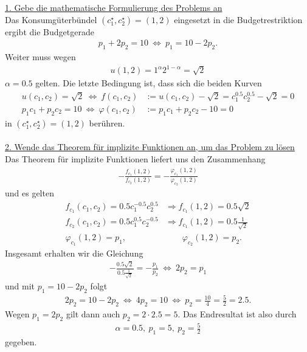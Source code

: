 \underline{1. Gebe die mathematische Formulierung des Problems an}\\
Das Konsumgüterbündel $ (c_1^\star,c_2^\star)  = (1,2)$ eingesetzt in die Budgetrestriktion ergibt die Budgetgerade
\begin{align*}
 p_1 + 2 p_2 = 10
 \
 \Leftrightarrow
 \
 p_1 = 10 - 2 p_2.
\end{align*}
Weiter muss wegen
\begin{align*}
u(1,2) = 1^\alpha 2^{1-\alpha} = \sqrt{2}
\end{align*}
$ \alpha = 0.5 $ gelten.
Die letzte Bedingung ist, dass sich die beiden Kurven 
\begin{align*}
u(c_1,c_2) = \sqrt{2 } 
 \ \Leftrightarrow \ 
f(c_1,c_2) &:= u(c_1,c_2) - \sqrt{2} = c_1^{0.5}c_2^{0.5} - \sqrt{2} =  0\\
p_1 c_1 + p_2 c_2 = 10
\ \Leftrightarrow \
\varphi(c_1,c_2) &:= p_1 c_1 + p_2 c_2 - 10 = 0
\end{align*}
in $ (c_1^\star,c_2^\star)  = (1,2)$ berühren.
\\
\\
\underline{2. Wende das Theorem für implizite Funktionen an, um das Problem zu lösen}\\ 
Das Theorem für implizite Funktionen liefert uns den Zusammenhang
\begin{align*}
- \frac{f_{c_1}(1,2)}{f_{c_2}(1,2)}
=
- \frac{\varphi_{c_1}(1,2)}{\varphi_{c_2}(1,2)}
\end{align*}
und es gelten 
\begin{align*}
f_{c_1}(c_1,c_2) = 0.5 c_1^{-0.5} c_2^{0.5}
&\Rightarrow 
f_{c_1}(1,2) = 0.5 \sqrt{2}\\
f_{c_2}(c_1,c_2) = 0.5 c_1^{0.5} c_2^{-0.5}
&\Rightarrow 
f_{c_1}(1,2) = 0.5 \frac{1}{\sqrt{2}}\\
\varphi_{c_1}(1,2) = p_1, &\qquad 
\varphi_{c_2}(1,2) = p_2.
\end{align*}
Insgesamt erhalten wir die Gleichung
\begin{align*}
- \frac{0.5 \sqrt{2}}{0.5 \frac{1}{\sqrt{2}}} = - \frac{p_1}{p_2}
\
\Leftrightarrow
\
2 p_2 = p_1
\end{align*}
und mit $ p_1 = 10 - 2 p_2 $ folgt
\begin{align*}
2 p_2 = 10 - 2 p_2 \ 
\Leftrightarrow
\
4 p_2 = 10 
\ \Leftrightarrow \
p_2 = \frac{10}{4} = \frac{5}{2} = 2.5.
\end{align*}
Wegen $ p_1 = 2 p_2 $ gilt dann auch $ p_2 = 2 \cdot 2.5 = 5 $.
Das Endresultat ist also durch
\begin{align*}
\alpha = 0.5 , \ p_1 = 5, \ p_2 =  \frac{5}{2}
\end{align*}
gegeben.

